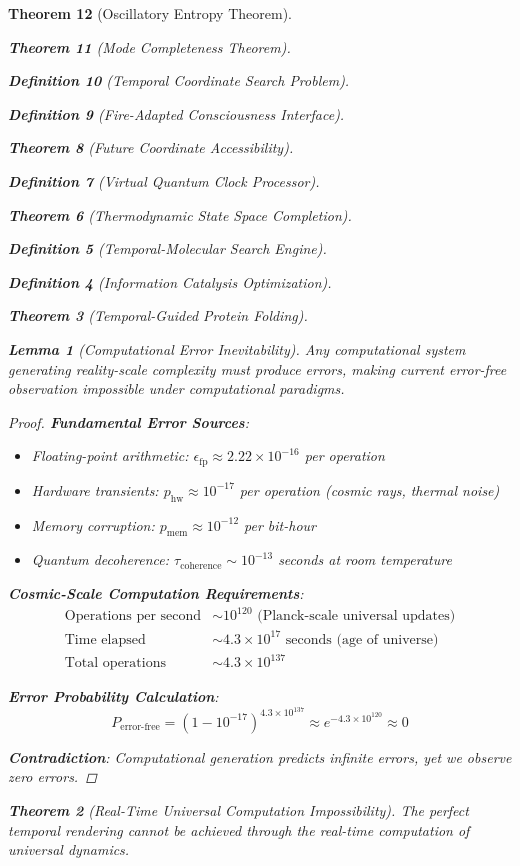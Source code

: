 \documentclass[12pt,a4paper]{article}
\newtheorem{theorem}{Theorem}[section]
\newtheorem{lemma}[theorem]{Lemma}
\newtheorem{definition}[theorem]{Definition}
\begin{document}
\begin{theorem}[Oscillatory Entropy Theorem]
\begin{theorem}[Mode Completeness Theorem]
\begin{enumerate}
\begin{definition}[Temporal Coordinate Search Problem]
\begin{algorithm}
\begin{definition}[Fire-Adapted Consciousness Interface]
\begin{theorem}[Future Coordinate Accessibility]
\begin{definition}[Virtual Quantum Clock Processor]
\begin{itemize}
\begin{itemize}
\begin{theorem}[Thermodynamic State Space Completion]
\begin{definition}[Temporal-Molecular Search Engine]
\begin{definition}[Information Catalysis Optimization]
\begin{algorithm}
\begin{theorem}[Temporal-Guided Protein Folding]
\begin{table}[h]
\begin{lemma}[Computational Error Inevitability]
Any computational system generating reality-scale complexity must produce errors, making current error-free observation impossible under computational paradigms.
\end{lemma}

\begin{proof}
\textbf{Fundamental Error Sources}:
\begin{itemize}
    \item Floating-point arithmetic: $\epsilon_{\text{fp}} \approx 2.22 \times 10^{-16}$ per operation
    \item Hardware transients: $p_{\text{hw}} \approx 10^{-17}$ per operation (cosmic rays, thermal noise)
    \item Memory corruption: $p_{\text{mem}} \approx 10^{-12}$ per bit-hour
    \item Quantum decoherence: $\tau_{\text{coherence}} \sim 10^{-13}$ seconds at room temperature
\end{itemize}

\textbf{Cosmic-Scale Computation Requirements}:
\begin{align}
\text{Operations per second} &\sim 10^{120} \text{ (Planck-scale universal updates)} \\
\text{Time elapsed} &\sim 4.3 \times 10^{17} \text{ seconds (age of universe)} \\
\text{Total operations} &\sim 4.3 \times 10^{137}
\end{align}

\textbf{Error Probability Calculation}:
$$P_{\text{error-free}} = (1-10^{-17})^{4.3 \times 10^{137}} \approx e^{-4.3 \times 10^{120}} \approx 0$$

\textbf{Contradiction}: Computational generation predicts infinite errors, yet we observe zero errors.
\end{proof}

\begin{theorem}[Real-Time Universal Computation Impossibility]
The perfect temporal rendering cannot be achieved through the real-time computation of universal dynamics.
\end{theorem}


\end{table}
\end{theorem}
\end{algorithm}
\end{definition}
\end{definition}
\end{theorem}
\end{itemize}
\end{itemize}
\end{definition}
\end{theorem}
\end{definition}
\end{algorithm}
\end{definition}
\end{enumerate}
\end{theorem}
\end{theorem}
\end{document}
